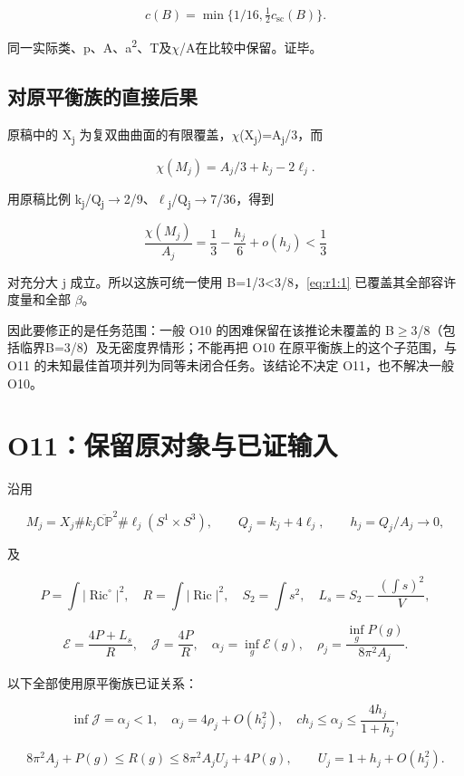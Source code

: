 \documentclass[UTF8,11pt,openany,oneside,fontset=none]{ctexbook}
\begin{document}
\[
\boxed{c(B)=\min\{1/16,\tfrac12c_{\mathrm{sc}}(B)\}.}
\]

同一实际类、p、A、a\textsuperscript{2}、T及\(\chi\)/A在比较中保留。证毕。

\subsection{对原平衡族的直接后果}\label{ch1:ux5bf9ux539fux5e73ux8861ux65cfux7684ux76f4ux63a5ux540eux679c}

原稿中的 X\textsubscript{j} 为复双曲曲面的有限覆盖，\(\chi\)(X\textsubscript{j})=A\textsubscript{j}/3，而

\[
\chi(M_j)=A_j/3+k_j-2\ell_j.
\]

用原稿比例 k\textsubscript{j}/Q\textsubscript{j}\(\to\)2/9、\(\ell\)\textsubscript{j}/Q\textsubscript{j}\(\to\)7/36，得到

\[
\frac{\chi(M_j)}{A_j}
=\frac13-\frac{h_j}{6}+o(h_j)<\frac13
\]

对充分大 j 成立。所以这族可统一使用 B=1/3\textless3/8，\eqref{eq:r1:1} 已覆盖其全部容许度量和全部 \(\beta\)。

因此要修正的是任务范围：一般 O10 的困难保留在该推论未覆盖的 B\(\ge\)3/8（包括临界B=3/8）及无密度界情形；不能再把 O10 在原平衡族上的这个子范围，与 O11 的未知最佳首项并列为同等未闭合任务。该结论不决定 O11，也不解决一般 O10。

\section{O11：保留原对象与已证输入}\label{ch1:o11ux4fddux7559ux539fux5bf9ux8c61ux4e0eux5df2ux8bc1ux8f93ux5165}

沿用

\[
M_j=X_j\#k_j\overline{\mathbb{CP}}^2
\#\ell_j(S^1\times S^3),\qquad
Q_j=k_j+4\ell_j,\qquad h_j=Q_j/A_j\to0,
\]

及

\[
P=\int|\operatorname{Ric}^{\circ}|^2,\quad
R=\int|\operatorname{Ric}|^2,\quad S_2=\int s^2,
\quad L_s=S_2-\frac{(\int s)^2}{V},
\]

\[
\mathcal E=\frac{4P+L_s}{R},\quad
\mathcal J=\frac{4P}{R},\quad
\alpha_j=\inf_g\mathcal E(g),\quad
\rho_j=\frac{\inf_gP(g)}{8\pi^2A_j}.
\]

以下全部使用原平衡族已证关系：

\[
\inf\mathcal J=\alpha_j<1,\quad
\alpha_j=4\rho_j+O(h_j^2),\quad
c h_j\le\alpha_j\le\frac{4h_j}{1+h_j},
\tag{1.5}\label{eq:r1:5}
\]

\[
8\pi^2A_j+P(g)\le R(g)\le8\pi^2A_jU_j+4P(g),
\qquad U_j=1+h_j+O(h_j^2).
\tag{1.6}\label{eq:r1:6}
\]
\end{document}
